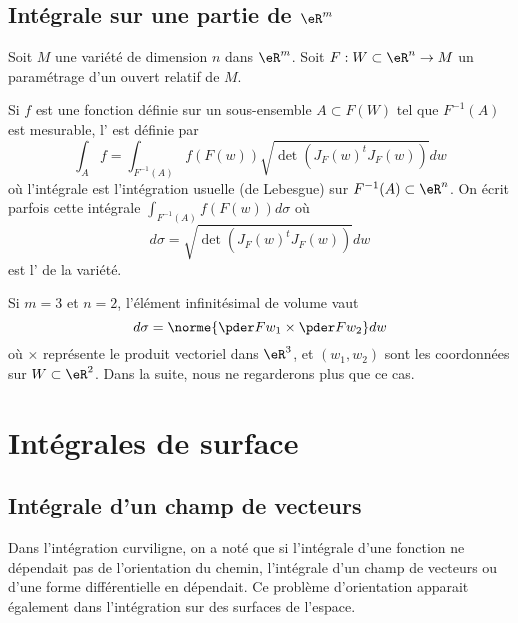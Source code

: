 \subsection{Intégrale sur une partie de \( \eR^m\)}

Soit $M$ une variété de dimension $n$ dans $\eR^m$. Soit $F : W \subset \eR^n \to M$ un paramétrage d'un ouvert relatif de $M$.

Si $f$ est une fonction définie sur un sous-ensemble $A \subset F(W)$ tel que $F^{-1}(A)$ est mesurable, l' est définie par
\begin{equation*}
	\int_A f = \int_{F^{-1}(A)} f(F(w)) \sqrt{\det(J_F(w)^t {J_F(w)})} dw
\end{equation*}
où l'intégrale est l'intégration usuelle (de Lebesgue) sur $F^{-1}(A) \subset \eR^n$. On écrit parfois cette intégrale $\int_{F^{-1}(A)} f(F(w)) d\sigma$ où
\begin{equation}        \label{EQooARMAooQPhQAL}
	d\sigma = \sqrt{\det(J_F(w)^t {J_F(w)})} dw
\end{equation}
est l' de la variété.

Si $m = 3$ et $n = 2$, l'élément infinitésimal de volume vaut
\begin{equation*}
	d \sigma = \norme{\pder F {w_1} \times \pder F {w_2}} dw
\end{equation*}
où $\times$ représente le produit vectoriel dans $\eR^3$, et $(w_1,w_2)$ sont les coordonnées sur $W \subset \eR^2$. Dans la suite, nous ne regarderons plus que ce cas.

\section{Intégrales de surface}
\label{secintsurfaciques}

\subsection{Intégrale d'un champ de vecteurs}
Dans l'intégration curviligne, on a noté que si l'intégrale d'une fonction ne dépendait pas de l'orientation du chemin, l'intégrale d'un champ de vecteurs ou d'une forme différentielle en dépendait. Ce problème d'orientation apparait également dans l'intégration sur des surfaces de l'espace.

